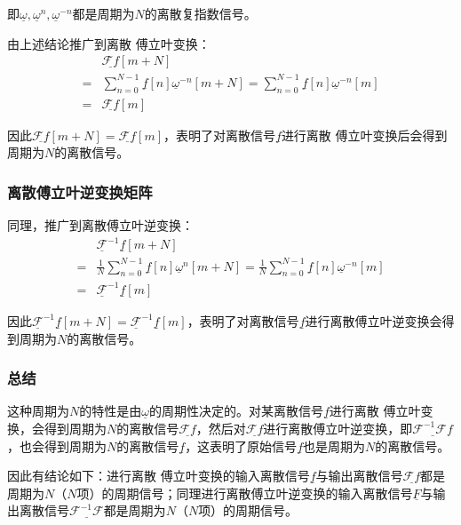 即$\underline{\omega},\underline{\omega}^n,\underline{\omega}^{-n}$都是周期为$N$的离散复指数信号。


由上述结论推广到离散 傅立叶变换：
\begin{align*}
	  & \underline{\mathcal{F}f}[m+N]                                \\
	= & \sum_{n=0}^{N-1}\underline{f}[n]\underline{\omega}^{-n}[m+N]
	= \sum_{n=0}^{N-1}\underline{f}[n]\underline{\omega}^{-n}[m]     \\
	= & \underline{\mathcal{F}f}[m]
\end{align*}

因此$\underline{\mathcal{F}f}[m+N] = \underline{\mathcal{F}f}[m]$，表明了对离散信号$\underline{f}$进行离散 傅立叶变换后会得到周期为$N$的离散信号。

\subsubsection{离散傅立叶逆变换矩阵}

同理，推广到离散傅立叶逆变换：
\begin{align*}
	  & \underline{\mathcal{F}}^{-1}\underline{f}[m+N]                                                                                                \\
	= & \frac{1}{N}\sum_{n=0}^{N-1}\underline{f}[n]\underline{\omega}^{n}[m+N]= \frac{1}{N}\sum_{n=0}^{N-1}\underline{f}[n]\underline{\omega}^{-n}[m] \\
	= & \underline{\mathcal{F}}^{-1}\underline{f}[m]
\end{align*}

因此$\underline{\mathcal{F}}^{-1}\underline{f}[m+N] = \underline{\mathcal{F}}^{-1}\underline{f}[m]$，表明了对离散信号$\underline{f}$进行离散傅立叶逆变换会得到周期为$N$的离散信号。
\subsubsection{总结}
这种周期为$N$的特性是由$\underline{\omega}$的周期性决定的。对某离散信号$\underline{f}$进行离散 傅立叶变换，会得到周期为$N$的离散信号$\underline{\mathcal{F}f}$，然后对$\underline{\mathcal{F}f}$进行离散傅立叶逆变换，即$\underline{\mathcal{F}^{-1}\mathcal{F}f}$，也会得到周期为$N$的离散信号$\underline{f}$，这表明了原始信号$\underline{f}$也是周期为$N$的离散信号。

因此有结论如下：进行离散 傅立叶变换的输入离散信号$\underline{f}$与输出离散信号$\underline{\mathcal{F}f}$都是周期为$N$（$N$项）的周期信号；同理进行离散傅立叶逆变换的输入离散信号$\underline{F}$与输出离散信号$\underline{\mathcal{F}^{-1}\mathcal{F}}$都是周期为$N$（$N$项）的周期信号。

